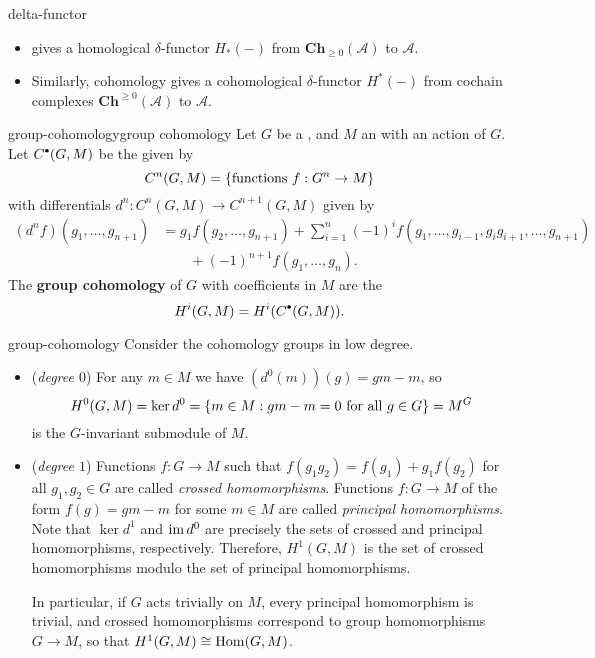 \begin{example}{delta-functor}
    \begin{itemize}
        \item {} gives a homological $\delta$-functor $H_*(-)$ from  $\textbf{Ch}_{\ge 0}(\mathcal{A})$ to $\mathcal{A}$.
        \item Similarly, cohomology gives a cohomological $\delta$-functor $H^*(-)$ from cochain complexes $\textbf{Ch}^{\ge 0}(\mathcal{A})$ to $\mathcal{A}$.
    \end{itemize}
\end{example}

\begin{topic}{group-cohomology}{group cohomology}
    Let $G$ be a , and $M$ an  with an action of $G$. Let $C^\bdot(G, M)$ be the  given by
    \[ C^n(G, M) = \{ \textup{functions } f : G^n \to M \} \]
    with differentials $d^n : C^n(G, M) \to C^{n + 1}(G, M)$ given by
    \[ \begin{aligned} (d^n f)(g_1, \ldots, g_{n + 1}) &= g_1 f(g_2, \ldots, g_{n + 1}) + \sum_{i = 1}^{n} (-1)^i f(g_1, \ldots, g_{i - 1}, g_i g_{i + 1}, \ldots, g_{n + 1}) \\ &\qquad + (-1)^{n + 1} f(g_1, \ldots, g_n) . \end{aligned} \]
    The \textbf{group cohomology} of $G$ with coefficients in $M$ are the 
    \[ H^i(G, M) = H^i(C^\bdot(G, M)) . \]
\end{topic}

\begin{example}{group-cohomology}
    Consider the cohomology groups in low degree.
    \begin{itemize}
        \item (\textit{degree $0$}) For any $m \in M$ we have $(d^0(m))(g) = gm - m$, so
        \[ H^0(G, M) = \ker d^0 = \{ m \in M : gm - m = 0 \textup{ for all } g \in G \} = M^G \]
        is the $G$-invariant submodule of $M$.
        \item (\textit{degree $1$}) Functions $f : G \to M$ such that $f(g_1 g_2) = f(g_1) + g_1 f(g_2)$ for all $g_1, g_2 \in G$ are called \textit{crossed homomorphisms}. Functions $f : G \to M$ of the form $f(g) = gm - m$ for some $m \in M$ are called \textit{principal homomorphisms}. Note that $\ker d^1$ and $\operatorname{im} d^0$ are precisely the sets of crossed and principal homomorphisms, respectively. Therefore, $H^1(G, M)$ is the set of crossed homomorphisms modulo the set of principal homomorphisms.
        
        In particular, if $G$ acts trivially on $M$, every principal homomorphism is trivial, and crossed homomorphisms correspond to group homomorphisms $G \to M$, so that $H^1(G, M) \cong \operatorname{Hom}(G, M)$.
    \end{itemize}
\end{example}

